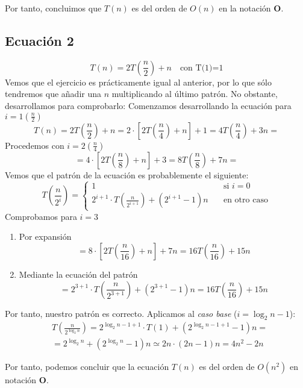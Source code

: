 \documentclass[12pt,spanish]{article}
\begin{document}
\begin{center}
Por tanto, concluimos que $T(n)$ es del orden de $O(n)$ en la notación \textbf{O}.
\end{center}

\subsection{Ecuación 2}
\[T(n)=2T(\frac{n}{2})+n \quad \text{con T(1)=1}\]
Vemos que el ejercicio es prácticamente igual al anterior, por lo que sólo tendremos que añadir una $n$ multiplicando al último patrón. No obstante, desarrollamos para comprobarlo: 
Comenzamos desarrollando la ecuación para $i=1 (\frac{n}{2})$
\[T(n)= 2T(\frac{n}{2})+n =2 \cdot \left[2T(\frac{n}{4})+n\right]+1 = 4T(\frac{n}{4})+3n= \]
Procedemos con $i=2 (\frac{n}{4})$
\[= 4 \cdot \left[2T(\frac{n}{8})+n\right]+3 = 8T(\frac{n}{8}) + 7n = \]
Vemos que el patrón de la ecuación es probablemente el siguiente: 
\[T(\frac{n}{2^i})=
\begin{cases}
	1 & \quad \text{si } i = 0  \\
	2^{i+1} \cdot T(\frac{n}{2^{i+1}}) + (2^{i+1} - 1)n & \quad \text{en otro caso}
\end{cases}
\]
Comprobamos para $i=3$
\begin{enumerate}
\item Por expansión
\[ = 8 \cdot \left[2T(\frac{n}{16})+n\right]+7n=16T(\frac{n}{16})+15n\]
\item Mediante la ecuación del patrón
\[ =2^{3+1} \cdot T(\frac{n}{2^{3+1}}) + (2^{3+1} - 1)n = 16T(\frac{n}{16})+15n \]
\end{enumerate}
Por tanto, nuestro patrón es correcto.
Aplicamos al \textit{caso base} ($i=\log_2n-1$):
\begin{equation}
\begin{split}
& T(\frac{n}{2^{\log_2n}})=2^{\log_2n-1 + 1} \cdot T(1) + (2^{\log_2n-1+1} - 1)n=\\
& = 2^{\log_2n} + (2^{\log_2n} - 1)n \simeq 2n \cdot (2n-1)n = 4n^2-2n
\end{split}
\end{equation}
\begin{center}
Por tanto, podemos concluir que la ecuación $T(n)$ es del orden de $O(n^2)$ en notación \textbf{O}.
\end{center}
\end{document}
